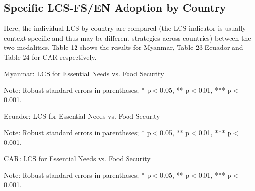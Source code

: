 \documentclass[11pt,harvard]{article}
\begin{document}
\pagebreak

\subsection{Specific LCS-FS/EN Adoption by Country}

Here, the individual LCS by country are compared (the LCS indicator is usually context specific and thus may be different strategies across countries) between the two modalities. Table 12 shows the results for Myanmar, Table 23 Ecuador and Table 24 for CAR respectively.

\begin{table}[htbp]
	\centering
	\begin{adjustbox}{max width=\textwidth}
		\begin{threeparttable}
			\caption{Myanmar: LCS for Essential Needs vs. Food Security}
			\scriptsize
			 
			\label{tab:LCS_F2F_EN_FS_Myanmar}
			\begin{tablenotes}
				\item Note: Robust standard errors in parentheses; * p$<$0.05, ** p$<$0.01, *** p$<$0.001. 
			\end{tablenotes}
		\end{threeparttable}
	\end{adjustbox}
\end{table}


\begin{table}[htbp]
	\centering
	\begin{adjustbox}{max width=\textwidth}
		\begin{threeparttable}
			\caption{Ecuador: LCS for Essential Needs vs. Food Security}
			\scriptsize
			 
			\label{tab:LCS_F2F_EN_FS_Ecuador}
			\begin{tablenotes}
				\item Note: Robust standard errors in parentheses; * p$<$0.05, ** p$<$0.01, *** p$<$0.001. 
			\end{tablenotes}
		\end{threeparttable}
	\end{adjustbox}
\end{table}


\begin{table}[htbp]
	\centering
	\begin{adjustbox}{max width=\textwidth}
		\begin{threeparttable}
			\caption{CAR: LCS for Essential Needs vs. Food Security}
			\scriptsize
			 
			\label{tab:LCS_F2F_EN_FS_CAR}
			\begin{tablenotes}
				\item Note: Robust standard errors in parentheses; * p$<$0.05, ** p$<$0.01, *** p$<$0.001. 
			\end{tablenotes}
		\end{threeparttable}
	\end{adjustbox}
\end{table}
\end{document}

